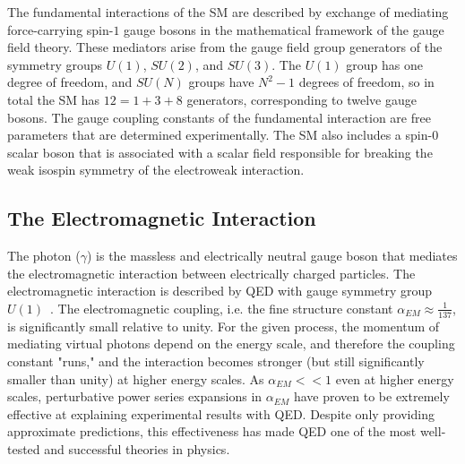 The fundamental interactions of the SM are described by exchange of mediating force-carrying spin-$1$ gauge bosons in the mathematical framework of the gauge field theory.
These mediators arise from the gauge field group generators of the symmetry groups $U(1)$, $SU(2)$, and $SU(3)$.
The $U(1)$ group has one degree of freedom, and $SU(N)$ groups have $N^2 - 1$ degrees of freedom, so in total the SM has $12 = 1 + 3 + 8$ generators, corresponding to twelve gauge bosons.
The gauge coupling constants of the fundamental interaction are free parameters that are determined experimentally.
The SM also includes a spin-$0$ scalar boson that is associated with a scalar field responsible for breaking the weak isospin symmetry of the electroweak interaction.

\subsection{The Electromagnetic Interaction}
The photon ($\gamma$) is the massless and electrically neutral gauge boson that mediates the electromagnetic interaction between electrically charged particles.
The electromagnetic interaction is described by QED with gauge symmetry group $U(1)$~\cite{nagashima_2013_V1}.
The electromagnetic coupling, i.e. the fine structure constant $\alpha_{EM} \approx \frac{1}{137}$, is significantly small relative to unity.
For the given process, the momentum of mediating virtual photons depend on the energy scale, and therefore the coupling constant "runs," and the interaction becomes stronger (but still significantly smaller than unity) at higher energy scales.
As $\alpha_{EM} << 1$ even at higher energy scales, perturbative power series expansions in $\alpha_{EM}$ have proven to be extremely effective at explaining experimental results with QED.
Despite only providing approximate predictions, this effectiveness has made QED one of the most well-tested and successful theories in physics.


